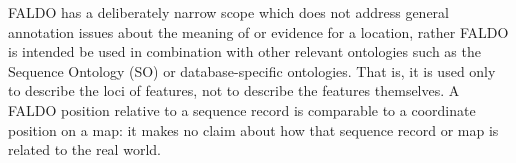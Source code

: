 FALDO has a deliberately narrow scope which does not address general annotation
issues about the meaning of or evidence for a location, rather FALDO is intended be
used in combination with other relevant ontologies such as the Sequence Ontology
(SO) \cite{SequenceOntology2005} or database-specific ontologies.
That is, it is used only to describe the loci of features, not to describe the features themselves.
A FALDO position relative to a sequence record is comparable to a
coordinate position on a map: it makes no claim about how that
sequence record or map is related to the real world.
 
